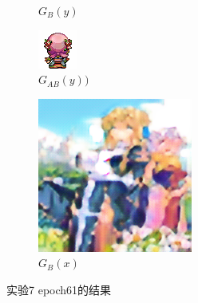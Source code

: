\documentclass{beamer}
\begin{document}
\begin{frame}
\begin{figure}[htb]
\begin{subfigure}[b]{0.23\linewidth}
        \caption{$G_B(y)$}
      \end{subfigure}
      \begin{subfigure}[b]{0.23\linewidth}
        \includegraphics[width=\linewidth]{exp7_epoch061_rec_B.png}
        \caption{$G_{AB}(y))$}
      \end{subfigure}
      \begin{subfigure}[b]{0.23\linewidth}
        \includegraphics[width=\linewidth]{exp7_epoch061_idt_B.png}
        \caption{$G_B(x)$}
      \end{subfigure}
      \caption{实验7 epoch61的结果}
      \label{fig:exp7epoch61}
\end{figure}
\end{frame}
\end{document}
